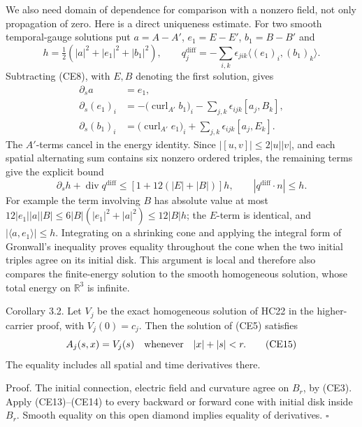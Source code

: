 \documentclass[11pt]{article}
\begin{document}
We also need domain of dependence for comparison with a nonzero field,
not only propagation of zero. Here is a direct uniqueness estimate.
For two smooth temporal-gauge solutions put
\(a=A-A'\), \(e_1=E-E'\), \(b_1=B-B'\) and
\[
 h=\tfrac12(|a|^2+|e_1|^2+|b_1|^2),\qquad
 q^{\mathrm{diff}}_j
 =-\sum_{i,k}\epsilon_{jik}\langle(e_1)_i,(b_1)_k\rangle.
\]
Subtracting (CE8), with \(E,B\) denoting the first solution, gives
\[
 \begin{aligned}
 \partial_sa&=e_1,\\
 \partial_s(e_1)_i
 &=-\bigl(\operatorname{curl}_{A'}b_1\bigr)_i
       -\sum_{j,k}\epsilon_{ijk}[a_j,B_k],\\
 \partial_s(b_1)_i
 &=\bigl(\operatorname{curl}_{A'}e_1\bigr)_i
       +\sum_{j,k}\epsilon_{ijk}[a_j,E_k].
 \end{aligned}\tag{CE13}
\]
The \(A'\)-terms cancel in the energy identity. Since
\(|[u,v]|\leq2|u||v|\), and each spatial alternating sum contains
six nonzero ordered triples, the remaining terms give the explicit bound
\[
 \partial_sh+\operatorname{div}q^{\mathrm{diff}}
 \leq [1+12(|E|+|B|)]h,\qquad
 |q^{\mathrm{diff}}\cdot n|\leq h.
 \tag{CE14}
\]
For example the term involving \(B\) has absolute value at most
\(12|e_1||a||B|\leq6|B|(|e_1|^2+|a|^2)\leq12|B|h\);
the \(E\)-term is identical, and
\(|\langle a,e_1\rangle|\leq h\).
Integrating on a shrinking cone and applying the integral form of
Gronwall's inequality proves equality throughout the cone when the
two initial triples agree on its initial disk. This argument is local
and therefore also compares the finite-energy solution to the smooth
homogeneous solution, whose total energy on \(\mathbb R^3\) is infinite.

Corollary 3.2. Let \(V_j\) be the exact homogeneous solution of
HC22 in the higher-carrier proof, with \(V_j(0)=c_j\).
Then the solution of (CE5) satisfies
\[
 A_j(s,x)=V_j(s)\quad\hbox{whenever}\quad |x|+|s|<r.
 \tag{CE15}
\]
The equality includes all spatial and time derivatives there.

Proof. The initial connection, electric field and curvature agree
on \(B_r\), by (CE3). Apply (CE13)–(CE14) to every backward or forward
cone with initial disk inside \(B_r\). Smooth equality on this open
diamond implies equality of derivatives. \(\square\)
\end{document}
